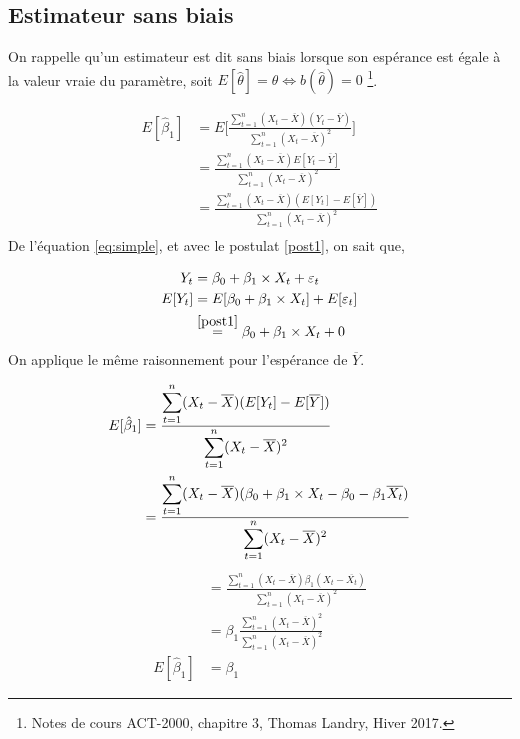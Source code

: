 \documentclass[11pt,french]{report}
\begin{document}
\subsection{Estimateur sans biais}
On rappelle qu'un estimateur est dit sans biais lorsque son espérance est égale à la valeur vraie du paramètre, soit $E[\hat{\theta}] = \theta \Leftrightarrow b(\hat{\theta}) = 0$ \footnote{Notes de cours ACT-2000, chapitre 3, Thomas Landry, Hiver 2017.}.

\begin{align*}
E[\hat{\beta}_1] &= E \Bigg[ \frac{\displaystyle\sum_{t=1}^n(X_t- \overline{X})(Y_t - \overline{Y})}{\displaystyle\sum_{t=1}^n(X_t - \overline{X})^2} \Bigg] \\
&= \frac{\displaystyle\sum_{t=1}^n(X_t- \overline{X})E[Y_t - \overline{Y}]}{\displaystyle\sum_{t=1}^n(X_t - \overline{X})^2} \\
&= \frac{\displaystyle\sum_{t=1}^n(X_t- \overline{X})(E[Y_t] - E[\overline{Y}])}{\displaystyle\sum_{t=1}^n(X_t - \overline{X})^2} \\
\end{align*}
De l'équation \ref{eq:simple}, et avec le postulat \ref{post1}, on sait que,

\begin{align*}
Y_t &= \beta_0 + \beta_1\times X_t + \varepsilon_t \\
E[Y_t] &= E[\beta_0 + \beta_1\times X_t] + E[\varepsilon_t] \\
&\overset{\ref{post1}}{=} \beta_0 + \beta_1\times X_t + 0 \\
\end{align*}
On applique le même raisonnement pour l'espérance de $\overline{Y}$. 

\begin{align*}
E[\hat{\beta}_1] &= \frac{\displaystyle\sum_{t=1}^n(X_t- \overline{X})(E[Y_t] - E[\overline{Y}])}{\displaystyle\displaystyle\sum_{t=1}^n(X_t - \overline{X})^2} \\
&= \frac{\displaystyle\sum_{t=1}^n(X_t- \overline{X})(\beta_0 + \beta_1\times X_t - \beta_0 - \beta_1\overline{X_t})}{\displaystyle\sum_{t=1}^n(X_t - \overline{X})^2} \\
\end{align*}
\begin{align*}
&= \frac{\displaystyle\sum_{t=1}^n(X_t- \overline{X})\beta_1 (X_t - \overline{X_t})}{\displaystyle\sum_{t=1}^n(X_t - \overline{X})^2} \\
&= \beta_1 \frac{\displaystyle\sum_{t=1}^n(X_t- \overline{X})^2}{\displaystyle\sum_{t=1}^n(X_t - \overline{X})^2} \\
E[\hat{\beta}_1] &= \beta_1
\end{align*}
\bigskip
\end{document}
